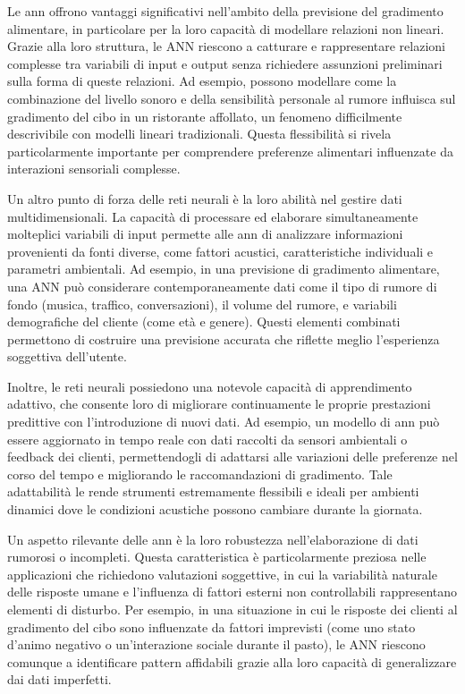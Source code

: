 Le \gls{ann} offrono vantaggi significativi nell'ambito della previsione del gradimento alimentare, in particolare per la loro capacità di modellare relazioni non lineari. Grazie alla loro struttura, le ANN riescono a catturare e rappresentare relazioni complesse tra variabili di input e output senza richiedere assunzioni preliminari sulla forma di queste relazioni. Ad esempio, possono modellare come la combinazione del livello sonoro e della sensibilità personale al rumore influisca sul gradimento del cibo in un ristorante affollato, un fenomeno difficilmente descrivibile con modelli lineari tradizionali. Questa flessibilità si rivela particolarmente importante per comprendere preferenze alimentari influenzate da interazioni sensoriali complesse. \cite{PANAGOU2009121}

Un altro punto di forza delle reti neurali è la loro abilità nel gestire dati multidimensionali. La capacità di processare ed elaborare simultaneamente molteplici variabili di input permette alle \gls{ann} di analizzare informazioni provenienti da fonti diverse, come fattori acustici, caratteristiche individuali e parametri ambientali. Ad esempio, in una previsione di gradimento alimentare, una ANN può considerare contemporaneamente dati come il tipo di rumore di fondo (musica, traffico, conversazioni), il volume del rumore, e variabili demografiche del cliente (come età e genere). Questi elementi combinati permettono di costruire una previsione accurata che riflette meglio l'esperienza soggettiva dell'utente. \cite{YU201868}

Inoltre, le reti neurali possiedono una notevole capacità di apprendimento adattivo, che consente loro di migliorare continuamente le proprie prestazioni predittive con l'introduzione di nuovi dati. Ad esempio, un modello di \gls{ann} può essere aggiornato in tempo reale con dati raccolti da sensori ambientali o feedback dei clienti, permettendogli di adattarsi alle variazioni delle preferenze nel corso del tempo e migliorando le raccomandazioni di gradimento. Tale adattabilità le rende strumenti estremamente flessibili e ideali per ambienti dinamici dove le condizioni acustiche possono cambiare durante la giornata.

Un aspetto rilevante delle \gls{ann} è la loro robustezza nell'elaborazione di dati rumorosi o incompleti. Questa caratteristica è particolarmente preziosa nelle applicazioni che richiedono valutazioni soggettive, in cui la variabilità naturale delle risposte umane e l'influenza di fattori esterni non controllabili rappresentano elementi di disturbo. Per esempio, in una situazione in cui le risposte dei clienti al gradimento del cibo sono influenzate da fattori imprevisti (come uno stato d'animo negativo o un'interazione sociale durante il pasto), le ANN riescono comunque a identificare pattern affidabili grazie alla loro capacità di generalizzare dai dati imperfetti. \cite{krishnamurthy2022}

